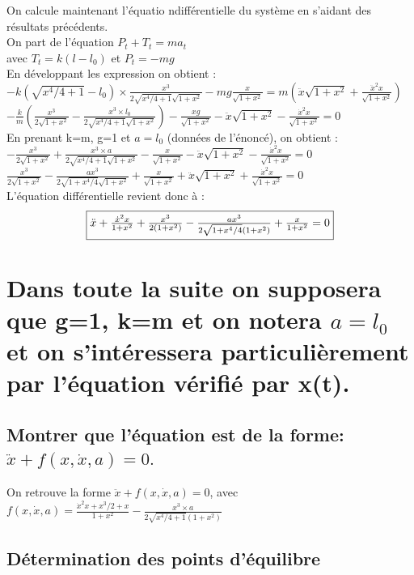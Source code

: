 \documentclass[10pt,a4paper]{article}
\begin{document}
%
On calcule maintenant l'équatio ndifférentielle du système en s'aidant des résultats précédents.\\
On part de l'équation $ P_t+T_t=ma_t $\\
avec $T_t=k(l-l_0)$ et $P_t=-mg$\\
En développant les expression on obtient :\\
$-k(\sqrt{x^4/4+1}-l_0)\times \frac{x^3}{2\sqrt{x^4/4+1}\sqrt{1+x^2}}-mg\frac{x}{\sqrt{1+x^2}}=m(\ddot{x}\sqrt{1+x^2}+\frac{\ddot{x}^2x}{\sqrt{1+x^2}})$\\
$ -\frac{k}{m}(\frac{x^3}{2\sqrt{1+x^2}}-\frac{x^3\times l_0}{2\sqrt{x^4/4+1}\sqrt{1+x^2}})-\frac{xg}{\sqrt{1+x^2}}-\ddot{x}\sqrt{1+x^2}-\frac{\dot{x}^2x}{\sqrt{1+x^2}}=0 $\\
En prenant k=m, g=1 et $a=l_0$ (données de l'énoncé), on obtient :\\
$ -\frac{x^3}{2\sqrt{1+x^2}}+\frac{x^3\times a}{2\sqrt{x^4/4+1}\sqrt{1+x^2}}-\frac{x}{\sqrt{1+x^2}}-\ddot{x}\sqrt{1+x^2}-\frac{\dot{x}^2x}{\sqrt{1+x^2}}=0 $\\
$\frac{x^3}{2\sqrt{1+x^2}}-\frac{a x^3}{2\sqrt{1+x^4/4}\sqrt{1+x^2}}+\frac{x}{\sqrt{1+x^2}}+\ddot{x}\sqrt{1+x^2}+\frac{\dot{x}^2x}{\sqrt{1+x^2}}=0$\\
L'équation différentielle revient donc à :\\
\[ \fbox{$ \ddot{x} + \frac{\dot{x}^2 x}{1+x^2} + \frac{x^3}{2(1+x^2)} - \frac{ax^3}{2\sqrt{1+x^4/4}(1+x^2)} + \frac{x}{1+x^2} = 0 $}\]

\section{Dans toute la suite on supposera que g=1, k=m et on notera $a=l_0$ et on s'intéressera particulièrement par l'équation vérifié par x(t).}
\subsection{Montrer que l'équation est de la forme: $\ddot{x} + f(x,\dot{x},a) = 0.$}
On retrouve la forme $\ddot{x} + f(x,\dot{x},a) = 0$, avec $f(x,\dot{x},a)=\frac{\dot{x}^2x+x^3/2+x}{1+x^2}-\frac{x^3\times a}{2\sqrt{x^4/4+1}(1+x^2)}$ 
\subsection{Détermination des points d'équilibre}
\end{document}
